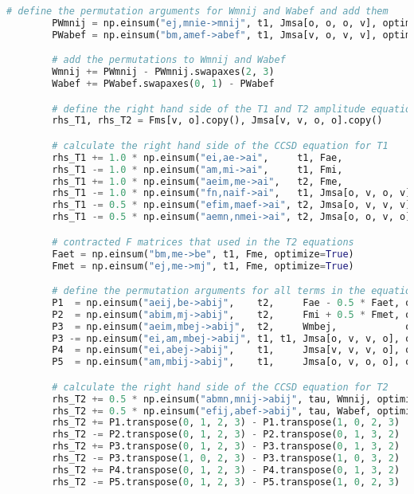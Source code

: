 \begin{lstlisting}[language=Python, caption={\acrshort{ccd} and \acrshort{ccsd} method exercise code solution.}, label=code:cc_solution]
        # define the permutation arguments for Wmnij and Wabef and add them
        PWmnij = np.einsum("ej,mnie->mnij", t1, Jmsa[o, o, o, v], optimize=True)
        PWabef = np.einsum("bm,amef->abef", t1, Jmsa[v, o, v, v], optimize=True)

        # add the permutations to Wmnij and Wabef
        Wmnij += PWmnij - PWmnij.swapaxes(2, 3)
        Wabef += PWabef.swapaxes(0, 1) - PWabef

        # define the right hand side of the T1 and T2 amplitude equations
        rhs_T1, rhs_T2 = Fms[v, o].copy(), Jmsa[v, v, o, o].copy()

        # calculate the right hand side of the CCSD equation for T1
        rhs_T1 += 1.0 * np.einsum("ei,ae->ai",     t1, Fae,              optimize=True)
        rhs_T1 -= 1.0 * np.einsum("am,mi->ai",     t1, Fmi,              optimize=True)
        rhs_T1 += 1.0 * np.einsum("aeim,me->ai",   t2, Fme,              optimize=True)
        rhs_T1 -= 1.0 * np.einsum("fn,naif->ai",   t1, Jmsa[o, v, o, v], optimize=True)
        rhs_T1 -= 0.5 * np.einsum("efim,maef->ai", t2, Jmsa[o, v, v, v], optimize=True)
        rhs_T1 -= 0.5 * np.einsum("aemn,nmei->ai", t2, Jmsa[o, o, v, o], optimize=True)

        # contracted F matrices that used in the T2 equations
        Faet = np.einsum("bm,me->be", t1, Fme, optimize=True)
        Fmet = np.einsum("ej,me->mj", t1, Fme, optimize=True)

        # define the permutation arguments for all terms in the equation for T2
        P1  = np.einsum("aeij,be->abij",    t2,     Fae - 0.5 * Faet, optimize=True)
        P2  = np.einsum("abim,mj->abij",    t2,     Fmi + 0.5 * Fmet, optimize=True)
        P3  = np.einsum("aeim,mbej->abij",  t2,     Wmbej,            optimize=True)
        P3 -= np.einsum("ei,am,mbej->abij", t1, t1, Jmsa[o, v, v, o], optimize=True)
        P4  = np.einsum("ei,abej->abij",    t1,     Jmsa[v, v, v, o], optimize=True)
        P5  = np.einsum("am,mbij->abij",    t1,     Jmsa[o, v, o, o], optimize=True)

        # calculate the right hand side of the CCSD equation for T2
        rhs_T2 += 0.5 * np.einsum("abmn,mnij->abij", tau, Wmnij, optimize=True)
        rhs_T2 += 0.5 * np.einsum("efij,abef->abij", tau, Wabef, optimize=True)
        rhs_T2 += P1.transpose(0, 1, 2, 3) - P1.transpose(1, 0, 2, 3)
        rhs_T2 -= P2.transpose(0, 1, 2, 3) - P2.transpose(0, 1, 3, 2)
        rhs_T2 += P3.transpose(0, 1, 2, 3) - P3.transpose(0, 1, 3, 2)
        rhs_T2 -= P3.transpose(1, 0, 2, 3) - P3.transpose(1, 0, 3, 2)
        rhs_T2 += P4.transpose(0, 1, 2, 3) - P4.transpose(0, 1, 3, 2)
        rhs_T2 -= P5.transpose(0, 1, 2, 3) - P5.transpose(1, 0, 2, 3)
        

\end{lstlisting}

